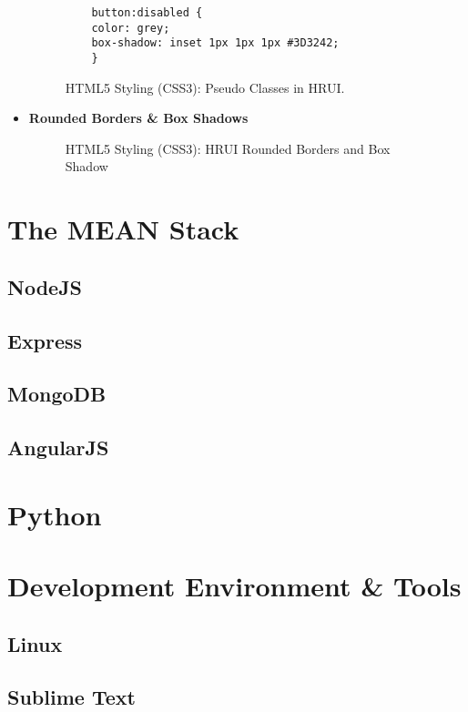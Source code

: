 \begin{itemize}
  \begin{figure}[h]
    \centering
    \begin{verbatim}
    button:disabled {
    color: grey;
    box-shadow: inset 1px 1px 1px #3D3242;
    }
    \end{verbatim}
    \caption{HTML5 Styling (CSS3): Pseudo Classes in HRUI.}
  \end{figure}
  \item \textbf{Rounded Borders \& Box Shadows}
  \begin{figure}[H]
    \begin{center}
    \end{center}
    \caption{HTML5 Styling (CSS3): HRUI Rounded Borders and Box Shadow}
  \end{figure}
\end{itemize}

\section{The MEAN Stack} \label{TheMEANStack}
\subsection{NodeJS}
\subsection{Express}
\subsection{MongoDB}
\subsection{AngularJS} \label{AngularJS}
\section{Python}
\section{Development Environment \& Tools}
\subsection{Linux}
\subsection{Sublime Text}
